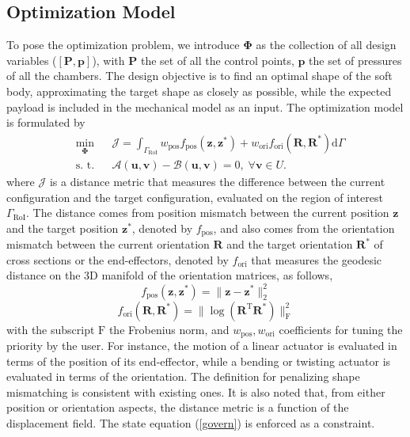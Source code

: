 \documentclass[journal]{IEEEtran}
\renewcommand{\vec}[1]{\mathbf{#1}}
\theoremstyle{definition}
\renewcommand{\vec}[1]{\mathbf{#1}}
\begin{document}
\subsection{Optimization Model}
To pose the optimization problem, we introduce $\vec{\Phi}$ as the collection of all design variables ($\left[\vec{P}, \vec{p}\right]$), with $\vec{P}$ the set of all the control points, $\vec{p}$ the set of pressures of all the chambers. The design objective is to find an optimal shape of the soft body, approximating the target shape as closely as possible, while the expected payload is included in the mechanical model as an input. The optimization model is formulated by
\begin{equation}\label{Model}
  \begin{aligned}
     & \underset{\vec{\Phi}}{\text{min}}
     &                                   & \mathcal{J}=\int_{\Gamma_{\text{RoI}}} w_{\text{pos}}f_{\text{pos}}(\vec{z},\vec{z}^{*}) +w_{\text{ori}}f_{\text{ori}}(\vec{R},\vec{R}^{*}) \mathrm{d} \Gamma \\
     & \text{s. t.}
     &                                   & \mathcal{A}(\vec{u}, \vec{v})-\mathcal{B}(\vec{u}, \vec{v})=0, \; \forall{\vec{v}\in{U}}.
  \end{aligned}
\end{equation}
where $\mathcal{J}$ is a distance metric that measures the difference between the current configuration and the target configuration, evaluated on the region of interest $\Gamma_{\text{RoI}}$. The distance comes from position mismatch between the current position $\vec{z}$ and the target position $\vec{z}^*$, denoted by $f_{\text{pos}}$, and also comes from the orientation mismatch between the current orientation $\vec{R}$ and the target orientation $\vec{R}^*$ of cross sections or the end-effectors, denoted by $f_{\text{ori}}$ that measures the geodesic distance on the 3D manifold of the orientation matrices, as follows,
\begin{equation}
  f_{\text{pos}}(\vec{z},\vec{z}^{*})=\| \vec{z}-\vec{z}^{*}\|_2^2
\end{equation}
\begin{equation}
  f_{\text{ori}}(\vec{R},\vec{R}^{*})=\| \log(\vec{R}^\text{T}\vec{R}^{*})\|_\text{F}^2
\end{equation}
with the subscript $\text{F}$ the Frobenius norm, and $w_{\text{pos}}, w_{\text{ori}}$ coefficients for tuning the priority by the user. For instance, the motion of a linear actuator is evaluated in terms of the position of its end-effector, while a bending or twisting actuator is evaluated in terms of the orientation. The definition for penalizing shape mismatching is consistent with existing ones\cite{maloisel2021automated}. It is also noted that,  from either position or orientation aspects, the distance metric is a function of the displacement field. The state equation (\ref{govern}) is enforced as a constraint.
\end{document}
